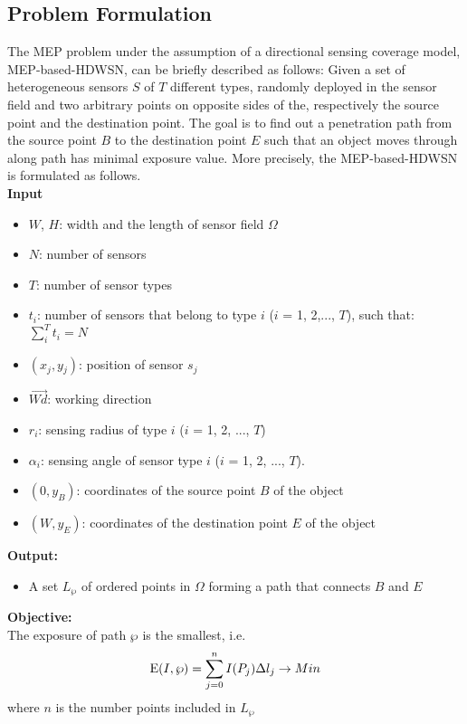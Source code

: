 \documentclass[final]{elsarticle}
\begin{document}
\subsection{Problem Formulation}
The MEP problem under the assumption of a directional sensing coverage model, MEP-based-HDWSN, can be briefly described as follows: Given a set of heterogeneous sensors $S$ of $T$ different types, randomly deployed in the sensor field   and two arbitrary points on opposite sides of the, respectively the source point and the destination point. The goal is to find out a penetration path from the source point $B$ to the destination point $E$ such that an object moves through along path has minimal exposure value. More precisely, the MEP-based-HDWSN is formulated as follows.\\
\textbf{Input}
\begin{itemize}
		\itemsep-0.2em
		\item $W$, $H$: width and the length of sensor field $\Omega$
		\item $N$: number of sensors
		\item $ T $: number of sensor types
		\item $ t_i $: number of sensors that belong to type $ i $ ($ i $ = 1, 2,..., $T$), such that:
		 $\sum\limits_i^T {{t_i}}  = N$
		 \item $({x_j},y{}_j)$: position of sensor $ s_j $
		 \item $\overrightarrow{Wd}$: working direction
		 \item $ r_i $: sensing radius of type $ i $ ($ i $ = 1, 2, ..., $ T $)
		 \item ${\alpha _i}$: sensing angle of sensor type $ i $ ($ i $ = 1, 2, ..., $ T $).
		\item $(0, y_B)$: coordinates of the source point $B$ of the object
		\item $(W, y_E)$: coordinates of the destination point $E$ of the object
\end{itemize}
\textbf{Output:}
\begin{itemize}
	\item A set ${L_\wp }$ of ordered points in $\Omega $ forming a path that connects $ B $ and $ E $ 
\end{itemize}
\textbf{Objective:}\\
The exposure of path  $\wp $ is the smallest, i.e.
\begin{equation}
\label{eqEmin}
{\rm E}(I,\wp ) = \sum\limits_{j = 0}^n {I(P_j)\Delta l_j}  \to Min
\end{equation}
where $ n $ is the number points included in ${L_\wp }$
\end{document}
